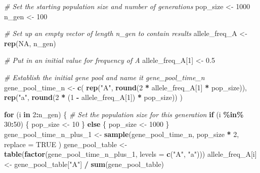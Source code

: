\documentclass[
  a4paper]{book}
\newenvironment{Shaded}{\begin{snugshade}}{\end{snugshade}}
\newcommand{\AttributeTok}[1]{\textcolor[rgb]{0.13,0.29,0.53}{#1}}
\newcommand{\CommentTok}[1]{\textcolor[rgb]{0.56,0.35,0.01}{\textit{#1}}}
\newcommand{\ConstantTok}[1]{\textcolor[rgb]{0.56,0.35,0.01}{#1}}
\newcommand{\ControlFlowTok}[1]{\textcolor[rgb]{0.13,0.29,0.53}{\textbf{#1}}}
\newcommand{\DecValTok}[1]{\textcolor[rgb]{0.00,0.00,0.81}{#1}}
\newcommand{\FloatTok}[1]{\textcolor[rgb]{0.00,0.00,0.81}{#1}}
\newcommand{\FunctionTok}[1]{\textcolor[rgb]{0.13,0.29,0.53}{\textbf{#1}}}
\newcommand{\NormalTok}[1]{#1}
\newcommand{\OtherTok}[1]{\textcolor[rgb]{0.56,0.35,0.01}{#1}}
\newcommand{\SpecialCharTok}[1]{\textcolor[rgb]{0.81,0.36,0.00}{\textbf{#1}}}
\newcommand{\StringTok}[1]{\textcolor[rgb]{0.31,0.60,0.02}{#1}}
\begin{document}
\begin{Shaded}
\begin{Highlighting}[]
\CommentTok{\# Set the starting population size and number of generations}
\NormalTok{pop\_size }\OtherTok{\textless{}{-}} \DecValTok{1000}
\NormalTok{n\_gen }\OtherTok{\textless{}{-}} \DecValTok{100}

\CommentTok{\# Set up an empty vector of length n\_gen to contain results}
\NormalTok{allele\_freq\_A }\OtherTok{\textless{}{-}} \FunctionTok{rep}\NormalTok{(}\ConstantTok{NA}\NormalTok{, n\_gen)}

\CommentTok{\# Put in an initial value for frequency of A}
\NormalTok{allele\_freq\_A[}\DecValTok{1}\NormalTok{] }\OtherTok{\textless{}{-}} \FloatTok{0.5}

\CommentTok{\# Establish the initial gene pool and name it gene\_pool\_time\_n}
\NormalTok{gene\_pool\_time\_n }\OtherTok{\textless{}{-}} \FunctionTok{c}\NormalTok{(}
  \FunctionTok{rep}\NormalTok{(}\StringTok{"A"}\NormalTok{, }\FunctionTok{round}\NormalTok{(}\DecValTok{2} \SpecialCharTok{*}\NormalTok{ allele\_freq\_A[}\DecValTok{1}\NormalTok{] }\SpecialCharTok{*}\NormalTok{ pop\_size)),}
  \FunctionTok{rep}\NormalTok{(}\StringTok{"a"}\NormalTok{, }\FunctionTok{round}\NormalTok{(}\DecValTok{2} \SpecialCharTok{*}\NormalTok{ (}\DecValTok{1} \SpecialCharTok{{-}}\NormalTok{ allele\_freq\_A[}\DecValTok{1}\NormalTok{]) }\SpecialCharTok{*}\NormalTok{ pop\_size))}
\NormalTok{)}

\ControlFlowTok{for}\NormalTok{ (i }\ControlFlowTok{in} \DecValTok{2}\SpecialCharTok{:}\NormalTok{n\_gen) \{}
  \CommentTok{\# Set the population size for this generation}
  \ControlFlowTok{if}\NormalTok{ (i }\SpecialCharTok{\%in\%} \DecValTok{30}\SpecialCharTok{:}\DecValTok{50}\NormalTok{) \{}
\NormalTok{    pop\_size }\OtherTok{\textless{}{-}} \DecValTok{10}
\NormalTok{  \} }\ControlFlowTok{else}\NormalTok{ \{}
\NormalTok{    pop\_size }\OtherTok{\textless{}{-}} \DecValTok{1000}
\NormalTok{  \}}
\NormalTok{  gene\_pool\_time\_n\_plus\_1 }\OtherTok{\textless{}{-}} \FunctionTok{sample}\NormalTok{(gene\_pool\_time\_n,}
\NormalTok{    pop\_size }\SpecialCharTok{*} \DecValTok{2}\NormalTok{,}
    \AttributeTok{replace =} \ConstantTok{TRUE}
\NormalTok{  )}
\NormalTok{  gene\_pool\_table }\OtherTok{\textless{}{-}} \FunctionTok{table}\NormalTok{(}\FunctionTok{factor}\NormalTok{(gene\_pool\_time\_n\_plus\_1,}
                                  \AttributeTok{levels =} \FunctionTok{c}\NormalTok{(}\StringTok{"A"}\NormalTok{, }\StringTok{"a"}\NormalTok{)))}
\NormalTok{  allele\_freq\_A[i] }\OtherTok{\textless{}{-}}\NormalTok{ gene\_pool\_table[}\StringTok{"A"}\NormalTok{] }\SpecialCharTok{/} \FunctionTok{sum}\NormalTok{(gene\_pool\_table)}


\end{Highlighting}
\end{Shaded}
\end{document}

